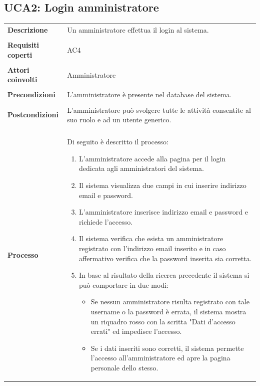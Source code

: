 \documentclass[10pt,a4paper]{report}
\begin{document}
	\subsection{UCA2: Login amministratore}
	\begin{tabular}{lp{}}
		\textbf{Descrizione}&Un amministratore effettua il login al sistema.\\
		\\
		\textbf{Requisiti coperti}&AC4\\
		\\
		\textbf{Attori coinvolti}&Amministratore\\
		\\
		\textbf{Precondizioni}&L'amministratore è presente nel database del sistema.\\
		\\
		\textbf{Postcondizioni}&L'amministratore può svolgere tutte le attività consentite al suo ruolo e ad un utente generico.\\
		\\
		\textbf{Processo}&Di seguito è descritto il processo:
		\begin{enumerate}
			\item L'amministratore accede alla pagina per il login dedicata agli amministratori del sistema.
			\item Il sistema visualizza due campi in cui inserire indirizzo email e password.
			\item L'amministratore inserisce indirizzo email e password e richiede l'accesso.
			\item Il sistema verifica che esista un amministratore registrato con l'indirizzo email inserito e in caso affermativo verifica che la password inserita sia corretta.
			\item In base al risultato della ricerca precedente il sistema si può comportare in due modi:
			\begin{itemize}
				\item Se nessun amministratore risulta registrato con tale username o la password è errata, il sistema mostra un riquadro rosso con la scritta "Dati d'accesso errati" ed impedisce l'accesso.
				\item Se i dati inseriti sono corretti, il sistema permette l'accesso all'amministratore ed apre la pagina personale dello stesso.
			\end{itemize}
		\end{enumerate}
	\end{tabular}
	
\end{document}

